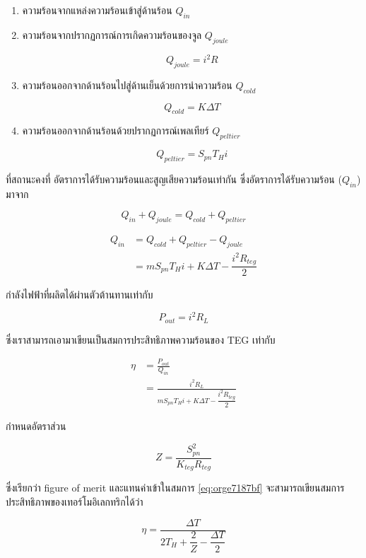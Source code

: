 \documentclass[a4paper,nobib,openany,10pt]{tufte-book}
\begin{document}
\begin{enumerate}
\item ความร้อนจากแหล่งความร้อนเข้าสู่ด้านร้อน \(Q_{in}\)

\item ความร้อนจากปรากฏการณ์การเกิดความร้อนของจูล \(Q_{joule}\)

\[Q_{joule} = i^2 R\]

\item ความร้อนออกจากด้านร้อนไปสู่ด้านเย็นด้วยการนำความร้อน \(Q_{cold}\)

\[Q_{cold} = K \Delta T\]

\item ความร้อนออกจากด้านร้อนด้วยปรากฏการณ์เพลเทียร์ \(Q_{peltier}\)

\[Q_{peltier} = S_{pn} T_H i\]
\end{enumerate}

ที่สถานะคงที่ อัตราการได้รับความร้อนและสูญเสียความร้อนเท่ากัน
ซึ่งอัตราการได้รับความร้อน (\(Q_{in}\)) มาจาก

\[Q_{in} + Q_{joule} = Q_{cold} + Q_{peltier}\]

\[\begin{aligned}
    Q_{in} &=  Q_{cold} + Q_{peltier} - Q_{joule}  \\
    &=  m S_{pn} T_H i +  K\Delta T -  \dfrac{i^2 R_{teg}}{2}
  \end{aligned}\]

กำลังไฟฟ้าที่ผลิตได้ผ่านตัวต้านทานเท่ากับ

\[P_{out} = i^2 R_L\]

ซึ่งเราสามารถเอามาเขียนเป็นสมการประสิทธิภาพความร้อนของ TEG เท่ากับ

\begin{align}
\label{eq:orge7187bf}
  \eta &= \frac{P_{out}}{Q_{in}} \\
  &= \frac{i^2 R_L}{ m S_{pn} T_H i + K \Delta T - \dfrac{ i^2 R_{teg}}{2}}
\end{align}

กำหนดอัตราส่วน

\begin{equation}
\label{eq:fig of merit}
 Z = \frac{S_{pn}^2}{K_{teg} R_{teg}}
\end{equation}

ซึ่งเรียกว่า figure of merit และแทนค่าเข้าในสมการ \ref{eq:orge7187bf} จะสามารถเขียนสมการประสิทธิภาพของเทอร์โมอิเลกทริกได้ว่า

\begin{equation}
\label{eq:orga596609}
  \eta = \dfrac{ \Delta T }{ 2 T_H + \dfrac{2}{Z} - \dfrac{ \Delta T }{ 2 } }
\end{equation}
\end{document}
